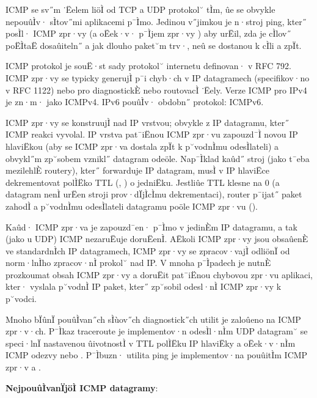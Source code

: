 ICMP se sv˝m ˙Ëelem liöÌ od TCP a UDP protokol˘ tÌm, ûe se obvykle nepouûÌv· sÌtov˝mi aplikacemi p¯Ìmo. Jedinou v˝jimkou je n·stroj ping, kter˝ posÌl· ICMP zpr·vy  (a oËek·v· p¯Ìjem zpr·vy ) aby urËil, zda je cÌlov˝ poËÌtaË dosaûiteln˝ a jak dlouho paket˘m trv·, neû se dostanou k cÌli a zpÏt.

ICMP protokol je souË·st sady protokol˘ internetu definovan· v RFC 792. ICMP zpr·vy se typicky generujÌ p¯i chyb·ch v IP datagramech (specifikov·no v RFC 1122) nebo pro diagnostickÈ nebo routovacÌ ˙Ëely. Verze ICMP pro IPv4 je zn·m· jako ICMPv4. IPv6 pouûÌv· obdobn˝ protokol: ICMPv6.

ICMP zpr·vy se konstruujÌ nad IP vrstvou; obvykle z IP datagramu, kter˝ ICMP reakci vyvolal. IP vrstva pat¯iËnou ICMP zpr·vu zapouzd¯Ì novou IP hlaviËkou (aby se ICMP zpr·va dostala zpÏt k p˘vodnÌmu odesÌlateli) a obvykl˝m zp˘sobem vznikl˝ datagram odeöle. Nap¯Ìklad kaûd˝ stroj (jako t¯eba mezilehlÈ routery), kter˝ forwarduje IP datagram, musÌ v IP hlaviËce dekrementovat polÌËko TTL (, ) o jedniËku. Jestliûe TTL klesne na 0 (a datagram nenÌ urËen stroji prov·dÏjÌcÌmu dekrementaci), router p¯ijat˝ paket zahodÌ a p˘vodnÌmu odesÌlateli datagramu poöle ICMP zpr·vu  ().

Kaûd· ICMP zpr·va je zapouzd¯en· p¯Ìmo v jedinÈm IP datagramu, a tak (jako u UDP) ICMP nezaruËuje doruËenÌ. AËkoli ICMP zpr·vy jsou obsaûenÈ ve standardnÌch IP datagramech, ICMP zpr·vy se zpracov·vajÌ odliönÏ od norm·lnÌho zpracov·nÌ prokol˘ nad IP. V mnoha p¯Ìpadech je nutnÈ prozkoumat obsah ICMP zpr·vy a doruËit pat¯iËnou chybovou zpr·vu aplikaci, kter· vyslala p˘vodnÌ IP paket, kter˝ zp˘sobil odesl·nÌ ICMP zpr·vy k p˘vodci.

Mnoho bÏûnÏ pouûÌvan˝ch sÌùov˝ch diagnostick˝ch utilit je zaloûeno na ICMP zpr·v·ch. P¯Ìkaz traceroute je implementov·n odesÌl·nÌm UDP datagram˘ se speci·lnÏ nastavenou ûivotnostÌ v TTL polÌËku IP hlaviËky a oËek·v·nÌm ICMP odezvy  nebo . P¯Ìbuzn· utilita ping je implementov·na pouûitÌm ICMP zpr·v  a .

\textbf{NejpouûÌvanÏjöÌ ICMP datagramy}:

